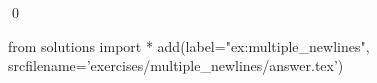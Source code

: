 
\begin{ex} 
  \label{ex:multiple_newlines}
  
  \qed
\end{ex} 
\begin{python0}
from solutions import *
add(label="ex:multiple_newlines",
    srcfilename='exercises/multiple_newlines/answer.tex') 
\end{python0}

